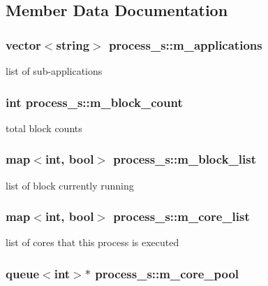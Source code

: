 \subsection{Member Data Documentation}
\hypertarget{structprocess__s_a3f8f9f073f0fc6dfe9c26078a125613c}{
\subsubsection[{m\_\-applications}]{\setlength{\rightskip}{0pt plus 5cm}vector$<$string$>$ {\bf process\_\-s::m\_\-applications}}}
\label{structprocess__s_a3f8f9f073f0fc6dfe9c26078a125613c}
list of sub-\/applications \hypertarget{structprocess__s_a746e127b1afbcf751be762e21472374b}{
\subsubsection[{m\_\-block\_\-count}]{\setlength{\rightskip}{0pt plus 5cm}int {\bf process\_\-s::m\_\-block\_\-count}}}
\label{structprocess__s_a746e127b1afbcf751be762e21472374b}
total block counts \hypertarget{structprocess__s_a42b0cd7d3f544dc9cd7689d5ecc98583}{
\subsubsection[{m\_\-block\_\-list}]{\setlength{\rightskip}{0pt plus 5cm}map$<$int, bool$>$ {\bf process\_\-s::m\_\-block\_\-list}}}
\label{structprocess__s_a42b0cd7d3f544dc9cd7689d5ecc98583}
list of block currently running \hypertarget{structprocess__s_a407d38bd942dd27e620147ac8af9a0a4}{
\subsubsection[{m\_\-core\_\-list}]{\setlength{\rightskip}{0pt plus 5cm}map$<$int, bool$>$ {\bf process\_\-s::m\_\-core\_\-list}}}
\label{structprocess__s_a407d38bd942dd27e620147ac8af9a0a4}
list of cores that this process is executed \hypertarget{structprocess__s_a12b9ed9259a013ff8126089193c93dc2}{
\subsubsection[{m\_\-core\_\-pool}]{\setlength{\rightskip}{0pt plus 5cm}queue$<$int$>$$\ast$ {\bf process\_\-s::m\_\-core\_\-pool}}}
